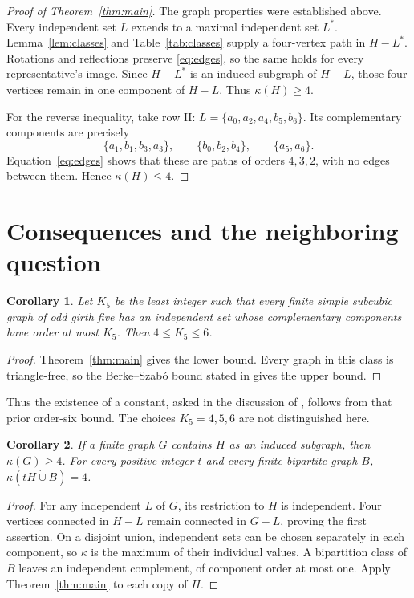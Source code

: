 \documentclass[11pt]{article}
\newtheorem{corollary}{Corollary}
\begin{document}
\begin{proof}[Proof of Theorem~\ref{thm:main}]
The graph properties were established above. Every independent set
$L$ extends to a maximal independent set $L^*$. Lemma~\ref{lem:classes}
and Table~\ref{tab:classes} supply a four-vertex path in $H-L^*$.
Rotations and reflections preserve \eqref{eq:edges}, so the same holds
for every representative's image. Since $H-L^*$ is an induced subgraph
of $H-L$, those four vertices remain in one component of $H-L$.
Thus $\kappa(H)\geq4$.

For the reverse inequality, take row II:
$L=\{a_0,a_2,a_4,b_5,b_6\}$. Its complementary components are precisely
\[
 \{a_1,b_1,b_3,a_3\},\qquad
 \{b_0,b_2,b_4\},\qquad
 \{a_5,a_6\}.
\]
Equation~\eqref{eq:edges} shows that these are paths of orders $4,3,2$,
with no edges between them. Hence $\kappa(H)\leq4$.
\end{proof}

\section{Consequences and the neighboring question}
\begin{corollary}\label{cor:universal}
Let $K_5$ be the least integer such that every finite simple subcubic
graph of odd girth five has an independent set whose complementary
components have order at most $K_5$. Then $4\leq K_5\leq6$.
\end{corollary}
\begin{proof}
Theorem~\ref{thm:main} gives the lower bound. Every graph in this class
is triangle-free, so the Berke--Szab\'o bound stated in
\cite[Lemma 4.7]{hausmann} gives the upper bound.
\end{proof}
Thus the existence of a constant, asked in the discussion of
\cite[Section 5, item 2]{aftd}, follows from that prior order-six bound.
The choices $K_5=4,5,6$ are not distinguished here.

\begin{corollary}\label{cor:induced}
If a finite graph $G$ contains $H$ as an induced subgraph, then
$\kappa(G)\geq4$. For every positive integer $t$ and every finite
bipartite graph $B$, $\kappa(tH\mathbin{\dot\cup}B)=4$.
\end{corollary}
\begin{proof}
For any independent $L$ of $G$, its restriction to $H$ is independent.
Four vertices connected in $H-L$ remain connected in $G-L$, proving
the first assertion. On a disjoint union, independent sets can be chosen
separately in each component, so $\kappa$ is the maximum of their
individual values. A bipartition class of $B$ leaves an independent
complement, of component order at most one. Apply Theorem~\ref{thm:main}
to each copy of $H$.
\end{proof}
\end{document}
